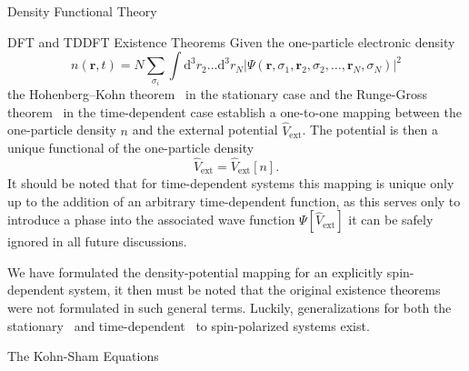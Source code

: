\documentclass[letterpaper, 11 pt]{report}
\begin{document}
\begin{chapter}{Density Functional Theory \label{chap:dft}}
\begin{section}{DFT and TDDFT Existence Theorems \label{sec:dft}}
      Given the one-particle electronic density
      \begin{equation} \label{eq:dendef1}
         n(\mathbf{r}, t) = N \sum\limits_{\sigma_i} \int \mathrm{d}^3 r_2 \dots \mathrm{d}^3 r_N
                            \left| \Psi(\mathbf{r}, \sigma_1, \mathbf{r}_2, \sigma_2, \dots,
                                   \mathbf{r}_N, \sigma_N) \right|^2
      \end{equation}
      the Hohenberg–Kohn theorem~\cite{hk-theorem} in the stationary case and the Runge-Gross
      theorem~\cite{rgt} in the time-dependent case establish a one-to-one mapping between the
      one-particle density $n$ and the external potential $\hat{V}_\mathrm{ext}$. The potential is
      then a unique functional of the one-particle density
      \begin{equation} \label{eq:vext-func}
         \hat{V}_\mathrm{ext} = \hat{V}_\mathrm{ext} [n].
      \end{equation}
      It should be noted that for time-dependent systems this mapping is unique only up to the addition
      of an arbitrary time-dependent function, as this serves only to introduce a phase into the
      associated wave function $\Psi[\hat{V}_\mathrm{ext}]$ it can be safely ignored in all future
      discussions.

      We have formulated the density-potential mapping for an explicitly spin-dependent system, it
      then must be noted that the original existence theorems were not formulated in such general terms.
      Luckily, generalizations for both the stationary~\cite{spin-dep1, spin-dep2} and
      time-dependent~\cite{td-spindep} to spin-polarized systems exist.

   \end{section}

   \begin{section}{The Kohn-Sham Equations \label{sec:ks}}


\end{section}
\end{chapter}
\end{document}
